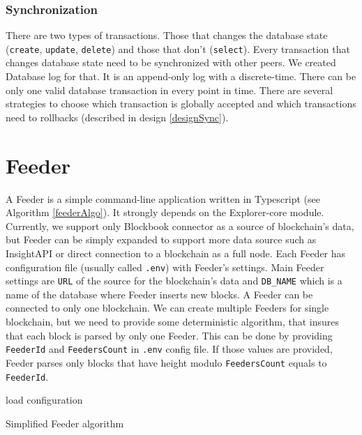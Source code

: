 \subsubsection{Synchronization}
There are two types of transactions. Those that changes the database state (\texttt{create}, \texttt{update}, \texttt{delete}) and those that don't (\texttt{select}). Every transaction that changes database state need to be synchronized with other peers. We created Database log for that. It is an append-only log with a discrete-time. There can be only one valid database transaction in every point in time. There are several strategies to choose which transaction is globally accepted and which transactions need to rollbacks (described in design \ref{designSync}).

\section{Feeder}
A Feeder is a simple command-line application written in Typescript (see Algorithm \ref{feederAlgo}). It strongly depends on the Explorer-core module. Currently, we support only Blockbook connector as a source of blockchain's data, but Feeder can be simply expanded to support more data source such as InsightAPI or direct connection to a blockchain as a full node. Each Feeder has configuration file (usually called \texttt{.env}) with Feeder's settings. Main Feeder settings are \texttt{URL} of the source for the blockchain's data and \texttt{DB\_NAME} which is a name of the database where Feeder inserts new blocks. A Feeder can be connected to only one blockchain. We can create multiple Feeders for single blockchain, but we need to provide some deterministic algorithm, that insures that each block is parsed by only one Feeder. This can be done by providing \texttt{FeederId} and \texttt{FeedersCount}  in \texttt{.env} config file. If those values are provided, Feeder parses only blocks that have height modulo \texttt{FeedersCount} equals to \texttt{FeederId}. 


\begin{algorithm}[H]
    \SetAlgoLined
    load configuration\;
    \caption{Simplified Feeder algorithm}
    \label{feederAlgo}
\end{algorithm}


